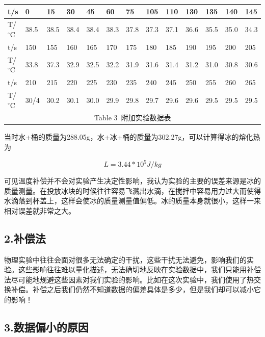 \documentclass[a4paper,10pt,notitlepage]{report}
\begin{document}
\begin{table}[htbp]
\centering
	\begin{tabular}{|l|l|l|l|l|l|l|l|l|l|l|l|l|}
	
		\hline
		t/s & 0 & 15 & 30 & 45 & 60 & 75 & 105 & 110 & 130 & 135 & 140 & 145 \\
		\hline
		T/$^{\circ}$C & 38.5 & 38.5 & 38.4 & 38.4 & 38.3 & 37.8 & 37.3 & 37.1 & 36.6 & 35.5 & 35.0 & 34.3 \\
		\hline
		\hline
		t/s & 150 & 155 & 160 & 165 & 170 & 175 & 180 & 185 & 190 & 195 & 200 & 205 \\
		\hline
		T/$^{\circ}$C & 33.8 & 37.3 & 32.9 & 32.5 & 32.2 & 31.9 & 31.6 & 31.4 & 31.2 & 31.0 & 30.8 & 30.6 \\
		\hline
		\hline
		t/s & 210 & 215 & 220 & 225 & 230 & 235 & 240 & 245 & 250 & 255 & 260 & 265 \\
		\hline
		T/$^{\circ}$C & 30/4 & 30.2 & 30.1 & 30.0 & 29.9 & 29.8 & 29.7 & 29.6 & 29.6 & 29.5 & 29.5 & 29.5 \\
		\hline
		\multicolumn{13}{c}{\scriptsize Table 3\ 附加实验数据表} \\
		
	\end{tabular}
\end{table}

		当时水+桶的质量为288.05g，水+冰+桶的质量为302.27g，可以计算得冰的熔化热为
		
\begin{equation*}
	L = 3.44 * 10^5 J/kg
\end{equation*}

	可见温度补偿并不会对实验产生决定性影响，我认为实验的主要的误差来源是冰的质量测量。在投放冰块的时候往往容易飞溅出水滴，在搅拌中容易用力过大而使得水滴落到杯盖上，这样会使冰的质量测量值偏低。冰的质量本身就很小，这样一来相对误差就非常之大。 \\
	
\subsection*{2.补偿法}

	物理实验中往往会面对很多无法确定的干扰，这些干扰无法避免，影响我们的实验。这些影响往往难以量化描述，无法确切地反映在实验数据中，我们只能用补偿法尽可能地规避这些因素对我们实验的影响。比如在这次实验中，我们使用了热交换补偿。补偿之后我们仍然不知道数据的偏差具体是多少，但是我们却可以减小它的影响！ \\
	
\subsection*{3.数据偏小的原因}
\end{document}
